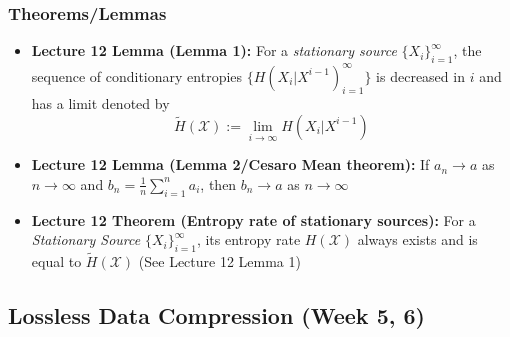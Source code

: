 \documentclass{article}
\begin{document}
\subsubsection{Theorems/Lemmas}
\begin{itemize}
    \item \textbf{Lecture 12 Lemma (Lemma 1): } For a \textit{stationary source} \(\{X_i\}^\infty_{i=1}\), the sequence of conditionary entropies \(\{H(X_i|X^{i-1})_{i=1}^\infty\}\) is decreased in \(i\) and has a limit denoted by
    \[\tilde{H}(\mathcal{X}) := \lim_{i \to \infty} H(X_i | X^{i-1})\]
    \item \textbf{Lecture 12 Lemma (Lemma 2/Cesaro Mean theorem): } If \(a_n \to a\) as \(n \to \infty\) and \(b_n = \frac{1}{n} \sum_{i=1}^{n}a_i\), then \(b_n \to a\) as \(n \to \infty\) %
    \item \textbf{Lecture 12 Theorem (Entropy rate of stationary sources): } For a \textit{Stationary Source} \(\{X_i\}_{i=1}^\infty\), its entropy rate \(H(\mathcal{X})\) always exists and is equal to \(\tilde{H}(\mathcal{X})\) (See Lecture 12 Lemma 1)

\end{itemize}
\subsection{Lossless Data Compression (Week 5, 6)}
\end{document}
